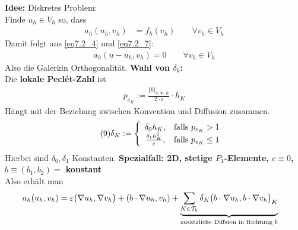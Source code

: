 \textbf{Idee:} Diskretes Problem:\\
Finde $u_h\in V_h$ so, dass
\begin{align}\label{eq7.2_7}\tag{7}
	a_h(u_h,v_h)&=f_h(v_h)\qquad\forall v_h\in V_h
\end{align}
Damit folgt aus \eqref{eq7.2_4} und \eqref{eq7.2_7}:
\begin{align}\label{eq7.2_8}\tag{8}
	a_h(u-u_h,v_h)=0\qquad\forall v_h\in V_h
\end{align}
Also die Galerkin Orthogonalität.\nl
\textbf{Wahl von $\delta_k$:}\\
Die \textbf{lokale Peclét-Zahl} ist
\begin{align*}
	p_{e_K}:=\frac{\Vert b\Vert_{0,\infty,K}}{2\cdot\varepsilon}\cdot h_K
\end{align*}
Hängt mit der Beziehung zwischen Konvention und Diffusion zusammen.
\begin{align}\label{eq7.2_9}\tag{9}
	\delta_K:=\left\lbrace\begin{array}{cl}
		\delta_0 h_K, &\text{falls } p_{e_K}>1\\
		\frac{\delta_1 h_K^2}{\varepsilon}, &\text{falls } p_{e_K}\leq 1
	\end{array}\right.
\end{align}
Hierbei sind $\delta_0,\delta_1$ Konstanten.\nl
\textbf{Spezialfall: 2D, stetige $P_1$-Elemente, $c\equiv0$, $b\equiv(b_1,b_2)=$ konstant}\\
Also erhält man
\begin{align*}
	a_h(u_h,v_h)&=\varepsilon\big(\nabla u_h,\nabla v_h\big)+(b\cdot\nabla u_h,v_h)
	+\underbrace{\sum\limits_{K\in\mathcal{T}_h}\delta_K\big(b\cdot\nabla u_h,b\cdot\nabla v_h\big)_K}_{\text{zusätzliche Diffsion in Richtung }b}
\end{align*}

